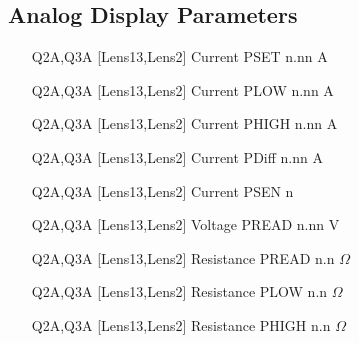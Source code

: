 \documentclass[11pt]{book}		%
\begin{document}
\subsection{Analog Display Parameters} \label{sect:cyc-op-interface-status-beamline-tofc1-analog-display}

\begin{enumerate}
 \item [Q2A,Q3A] [Lens13,Lens2] Current PSET  n.nn A
 \item [Q2A,Q3A] [Lens13,Lens2] Current PLOW  n.nn A
 \item [Q2A,Q3A] [Lens13,Lens2] Current PHIGH n.nn A
 \item [Q2A,Q3A] [Lens13,Lens2] Current PDiff n.nn A
 \item [Q2A,Q3A] [Lens13,Lens2] Current PSEN  n
 \item [Q2A,Q3A] [Lens13,Lens2] Voltage PREAD n.nn V
 \item [Q2A,Q3A] [Lens13,Lens2] Resistance PREAD n.n $\Omega$
 \item [Q2A,Q3A] [Lens13,Lens2] Resistance PLOW n.n $\Omega$
 \item [Q2A,Q3A] [Lens13,Lens2] Resistance PHIGH n.n $\Omega$
\end{enumerate}
\end{document}
